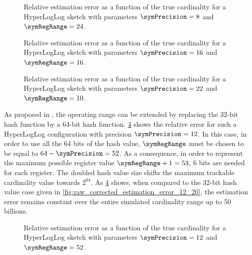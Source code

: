 \documentclass[a4paper]{scrartcl}
\begin{document}
\begin{figure}
\centering

\caption{Relative estimation error as a function of the true cardinality for a HyperLogLog sketch with parameters $\symPrecision = 8$ and $\symRegRange=24$.}
\label{fig:raw_corrected_estimation_error_8_24}
\end{figure}

\begin{figure}
\centering

\caption{Relative estimation error as a function of the true cardinality for a HyperLogLog sketch with parameters $\symPrecision = 16$ and $\symRegRange=16$.}
\label{fig:raw_corrected_estimation_error_16_16}
\end{figure}

\begin{figure}
\centering

\caption{Relative estimation error as a function of the true cardinality for a HyperLogLog sketch with parameters $\symPrecision = 22$ and $\symRegRange=10$.}
\label{fig:raw_corrected_estimation_error_22_10}
\end{figure}

As proposed in \cite{Heule2013}, the operating range can be extended by
replacing the 32-bit hash function by a 64-bit hash function. \cref{fig:raw_corrected_estimation_error_12_52} shows the relative error for such a HyperLogLog configuration with precision  $\symPrecision=12$. In this case, in order to use all the 64 bits of the hash value, $\symRegRange$ must be chosen to be equal to $64 - \symPrecision = 52$. As a consequence, in order to represent the maximum possible register value $\symRegRange+1 = 53$, 6 bits are needed for each register. The doubled hash value size shifts the maximum trackable cardinality value towards $2^{64}$. As \cref{fig:raw_corrected_estimation_error_12_52} shows, when compared to the 32-bit hash value case given in \cref{fig:raw_corrected_estimation_error_12_20}, the estimation error remains constant over the entire simulated cardinality range up to 50 billions.

\begin{figure}
\centering

\caption{Relative estimation error as a function of the true cardinality for a HyperLogLog sketch with parameters $\symPrecision = 12$ and $\symRegRange=52$.}
\label{fig:raw_corrected_estimation_error_12_52}
\end{figure}
\end{document}
